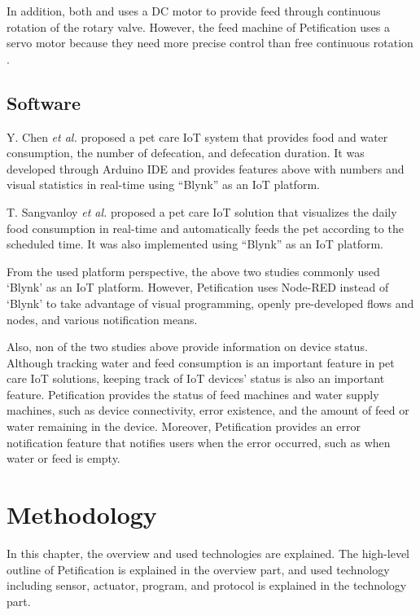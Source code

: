 \documentclass[conference]{IEEEtran}
\begin{document}
In addition, both \cite{b11} and \cite{b12} uses a DC motor to provide feed through continuous rotation of the rotary valve. However, the feed machine of Petification uses a servo motor because they need more precise control than free continuous rotation \cite{b13}.

\subsection{Software}
Y. Chen \textit{et al.} \cite{b5} proposed a pet care IoT system that provides food and water consumption, the number of defecation, and defecation duration. It was developed through Arduino IDE and provides features above with numbers and visual statistics in real-time using “Blynk” as an IoT platform.

T. Sangvanloy \textit{et al.} \cite{b4} proposed a pet care IoT solution that visualizes the daily food consumption in real-time and automatically feeds the pet according to the scheduled time. It was also implemented using “Blynk” as an IoT platform.

From the used platform perspective, the above two studies commonly used ‘Blynk’ as an IoT platform. However, Petification uses Node-RED instead of ‘Blynk’ to take advantage of visual programming, openly pre-developed flows and nodes, and various notification means.

Also, non of the two studies above provide information on device status. Although tracking water and feed consumption is an important feature in pet care IoT solutions, keeping track of IoT devices’ status is also an important feature. Petification provides the status of feed machines and water supply machines, such as device connectivity, error existence, and the amount of feed or water remaining in the device. Moreover, Petification provides an error notification feature that notifies users when the error occurred, such as when water or feed is empty.

\section{Methodology}
In this chapter, the overview and used technologies are explained. The high-level outline of Petification is explained in the overview part, and used technology including sensor, actuator, program, and protocol is explained in the technology part.
\end{document}
